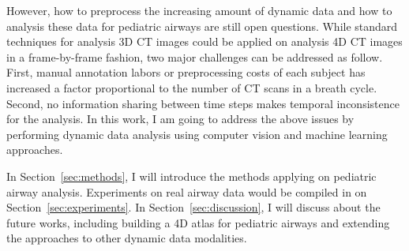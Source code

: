 However, how to preprocess the increasing amount of dynamic data and how to analysis these data for pediatric airways are still open questions.
While standard techniques for analysis 3D CT images could be applied on analysis 4D CT images in a frame-by-frame fashion, two major challenges can be addressed as follow.
First, manual annotation labors or preprocessing costs of each subject has increased a factor proportional to the number of CT scans in a breath cycle.
Second, no information sharing between time steps makes temporal inconsistence for the analysis.
In this work, I am going to address the above issues by performing dynamic data analysis using computer vision and machine learning approaches.

In Section~\ref{sec:methods}, I will introduce the methods applying on pediatric airway analysis.
Experiments on real airway data would be compiled in on Section~\ref{sec:experiments}.
In Section~\ref{sec:discussion}, I will discuss about the future works, including building a 4D atlas for pediatric airways and extending the approaches to other dynamic data modalities.
